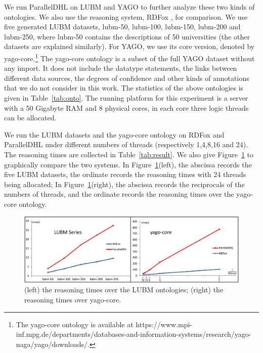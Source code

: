 We run ParallelDHL on LUBM and YAGO to further analyze these
two kinds of ontologies. We also use the reasoning system, RDFox \cite{MotikNPHO14},
for comparison. We use five generated LUBM datasets, lubm-50, lubm-100, lubm-150, lubm-200
and lubm-250, where lubm-50 contains the descriptions of 50 universities (the other datasets
are explained similarly). For YAGO, we use its core version, denoted by yago-core.\footnote{
The yago-core ontology is available at https://www.mpi-inf.mpg.de/departments/databases-and-information-systems/research/yago-naga/yago/downloads/.}
The yago-core ontology is a subset of the full YAGO dataset without any import.
It does not include the datatype statements, the links
between different data sources, the degrees of confidence and other kinds of
annotations that we do not consider in this work. The statistics of the above ontologies is given in Table~\ref{tab:onto}.
The running platform for this experiment is a server with a 50 Gigabyte RAM and 8 physical cores, in each core
three logic threads can be allocated.

We run the LUBM datasets and the yago-core ontology on RDFox and ParallelDHL under different numbers of
threads (respectively 1,4,8,16 and 24).
The reasoning times are collected in Table~\ref{tab:result}. We also give Figure~\ref{fig:reasoningtime} to
graphically compare the two systems.
In Figure~\ref{fig:reasoningtime}(left), the abscissa records the five LUBM datasets,
the ordinate records the reasoning times with 24 threads being allocated;
In Figure~\ref{fig:reasoningtime}(right), the abscissa records the reciprocals of the numbers of threads, and
the ordinate records the reasoning times over the yago-core ontology.


\begin{figure}[htbp]
\begin{center}
\includegraphics[width=1\textwidth]{fig-reasoningtime.eps}
\caption{(left) the reasoning times over the LUBM ontologies; (right) the reasoning times over yago-core.}
\label{fig:reasoningtime}
\end{center}
\end{figure}

